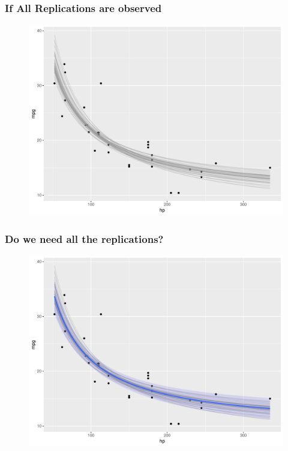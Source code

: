 \documentclass[12pt]{beamer}\usepackage[]{graphicx}\usepackage[]{color}
\begin{document}

\begin{frame}\large
\frametitle{If All Replications are observed}

\begin{figure}
 \includegraphics[width=0.7\paperwidth]{./Images/CIregLines}
\end{figure}
\end{frame}


\begin{frame}\large
\frametitle{Do we need all the replications?}

\begin{figure}
 \includegraphics[width=0.7\paperwidth]{./Images/CItogether}
\end{figure}
\end{frame}
\end{document}
